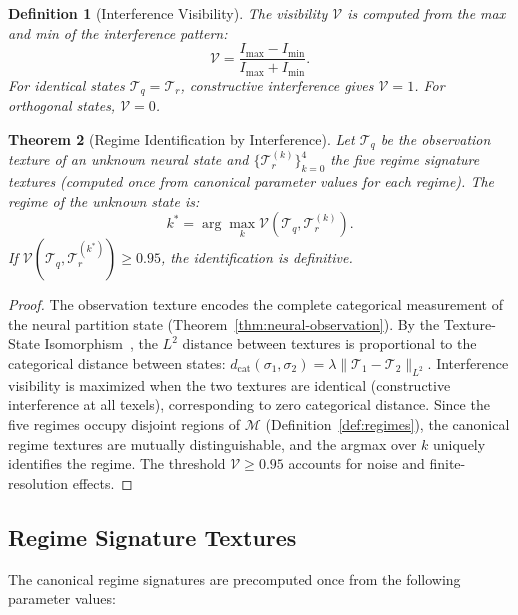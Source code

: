\documentclass[11pt,twocolumn,a4paper]{article}
\newtheorem{theorem}{Theorem}[section]
\newtheorem{definition}[theorem]{Definition}
\newcommand{\Tex}{\mathcal{T}}
\newcommand{\dcat}{d_{\mathrm{cat}}}
\begin{document}
\begin{definition}[Interference Visibility]
\label{def:visibility}
The visibility $\mathcal{V}$ is computed from the max and min of the interference pattern:
\begin{equation}
\mathcal{V} = \frac{I_{\max} - I_{\min}}{I_{\max} + I_{\min}}.
\label{eq:visibility}
\end{equation}
For identical states $\Tex_q = \Tex_r$, constructive interference gives $\mathcal{V} = 1$.
For orthogonal states, $\mathcal{V} = 0$.
\end{definition}

\begin{theorem}[Regime Identification by Interference]
\label{thm:regime-interference}
Let $\Tex_q$ be the observation texture of an unknown neural state and $\{\Tex_r^{(k)}\}_{k=0}^{4}$ the five regime signature textures (computed once from canonical parameter values for each regime).
The regime of the unknown state is:
\begin{equation}
k^* = \arg\max_k \mathcal{V}(\Tex_q, \Tex_r^{(k)}).
\label{eq:regime-id}
\end{equation}
If $\mathcal{V}(\Tex_q, \Tex_r^{(k^*)}) \geq 0.95$, the identification is definitive.
\end{theorem}

\begin{proof}
The observation texture encodes the complete categorical measurement of the neural partition state (Theorem~\ref{thm:neural-observation}).
By the Texture-State Isomorphism~\cite{sachikonye2026gpu}, the $L^2$ distance between textures is proportional to the categorical distance between states:
$\dcat(\sigma_1, \sigma_2) = \lambda \|\Tex_1 - \Tex_2\|_{L^2}$.
Interference visibility is maximized when the two textures are identical (constructive interference at all texels), corresponding to zero categorical distance.
Since the five regimes occupy disjoint regions of $\mathcal{M}$ (Definition~\ref{def:regimes}), the canonical regime textures are mutually distinguishable, and the argmax over $k$ uniquely identifies the regime.
The threshold $\mathcal{V} \geq 0.95$ accounts for noise and finite-resolution effects.
\end{proof}

\subsection{Regime Signature Textures}

The canonical regime signatures are precomputed once from the following parameter values:
\end{document}
